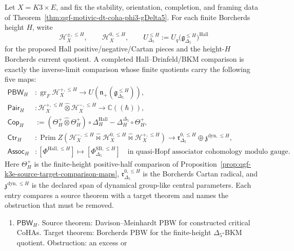 \begin{theorem}
\label{thm:qgf-k3e-hall-bkm-completion-datum}
Let \(X=K3\times E\), and fix the stability, orientation, completion, and
framing data of Theorem~\ref{thm:qgf-motivic-dt-coha-phi3-gDelta5}.
For each finite Borcherds height \(H\), write
\[
 \mathcal H^{\pm,\leq H}_{X},\qquad \mathcal H^{0,\leq H}_{X},
 \qquad
 U^{\leq H}_{\Delta_5}:=
 U_q\bigl(\mathfrak g_{\Delta_5}^{\leq H}\bigr)^{\mathrm{Hall}}
\]
for the proposed Hall positive/negative/Cartan pieces and the
height-\(H\) Borcherds current quotient. A completed
Hall--Drinfeld/BKM comparison is exactly the inverse-limit comparison
whose finite quotients carry the following five maps:
\[
\begin{aligned}
 \mathsf{PBW}_H&\colon
 \operatorname{gr}_F\mathcal H^{+,\leq H}_{X}
 \longrightarrow
 U(\mathfrak n_+(\mathfrak g_{\Delta_5}^{\leq H})),\\
 \mathsf{Pair}_H&\colon
 \mathcal H^{+,\leq H}_{X}\widehat\otimes
 \mathcal H^{-,\leq H}_{X}
 \longrightarrow \mathbb C((\hbar)),\\
 \mathsf{Cop}_H&:=
 (\Theta_H^+\widehat\otimes\Theta_H^+)\circ
 \Delta^{\mathrm{Hall}}_H
 -
 \Delta^{\Delta_5}_H\circ\Theta_H^+,\\
 \mathsf{Ctr}_H&\colon
 \operatorname{Prim}Z\!\left(
 \mathcal H^{-,\leq H}_{X}\widehat{\bowtie}
 \mathcal H^{0,\leq H}_{X}\widehat{\bowtie}
 \mathcal H^{+,\leq H}_{X}\right)
 \longrightarrow
 \mathfrak r^{0,\leq H}_{\Delta_5}\oplus
 \mathfrak z^{\mathrm{dyn},\leq H},\\
 \mathsf{Assoc}_H&\colon
 [\Phi^{\mathrm{Hall},\leq H}]
 \longmapsto
 [\Phi^{\mathrm{SB},\leq H}_{\Delta_5}]
 \quad\text{in quasi-Hopf associator cohomology modulo gauge.}
\end{aligned}
\]
Here \(\Theta_H^+\) is the finite-height positive-half comparison
of Proposition~\ref{prop:qgf-k3e-source-target-comparison-maps},
\(\mathfrak r^{0,\leq H}_{\Delta_5}\) is the Borcherds Cartan radical,
and \(\mathfrak z^{\mathrm{dyn},\leq H}\) is the declared span of
dynamical group-like central parameters. Each entry compares a source
theorem with a target theorem and names the obstruction that must be
removed.
\begin{enumerate}[label=\textup{(\roman*)}]
\item \(\mathsf{PBW}_H\). Source theorem: Davison--Meinhardt PBW for
constructed critical CoHAs. Target theorem: Borcherds PBW for the
finite-height \(\Delta_5\)-BKM quotient. Obstruction: an excess or

\end{enumerate}
\end{theorem}
